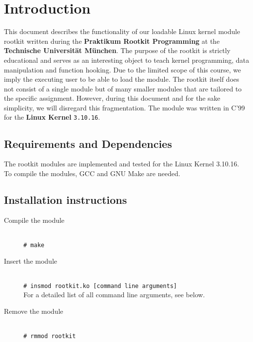 \chapter{Introduction}
This document describes the functionality of our loadable Linux kernel module 
rootkit written during the \textbf{Praktikum Rootkit Programming} at the 
\textbf{Technische Universität München}. The purpose of the rootkit is strictly 
educational and serves as an interesting object to teach kernel programming, 
data manipulation and function hooking. Due to the limited scope of this 
course, we imply the executing user to be able to load the module. The rootkit 
itself does not consist of a single module but of many smaller modules that are 
tailored to the specific assignment. However, during this document and for the 
sake simplicity, we will disregard this fragmentation. The module was written  in 
C'99 for the \textbf{Linux Kernel} \texttt{3.10.16}.

\section{Requirements and Dependencies}
The rootkit modules are implemented and tested for the Linux Kernel 
3.10.16.\\
To compile the modules, GCC and GNU Make are needed.

\section{Installation instructions}
\begin{description}
\item[Compile the module] \hfill\\
  \verb+# make+
\item[Insert the module] \hfill\\
  \verb+# insmod rootkit.ko [command line arguments]+\\
{\small For a detailed list of all command line arguments, see below.}
\item[Remove the module] \hfill\\
  \verb+# rmmod rootkit+   
\end{description}

